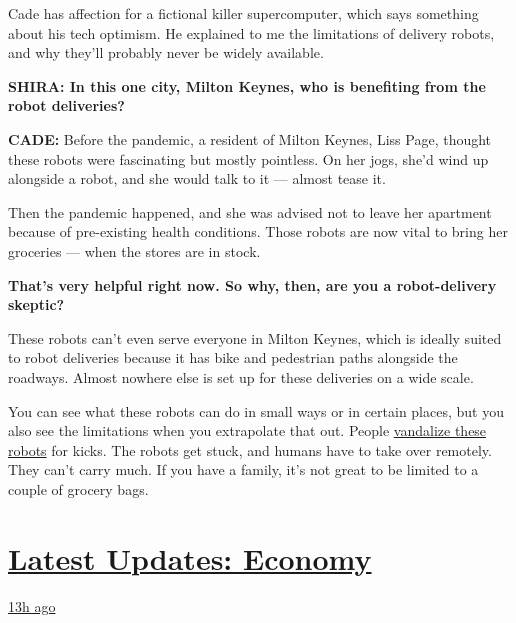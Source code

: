 Cade has affection for a fictional killer supercomputer, which says
something about his tech optimism. He explained to me the limitations of
delivery robots, and why they'll probably never be widely available.

\textbf{SHIRA: In this one city, Milton Keynes, who is benefiting from
the robot deliveries?}

\textbf{CADE:} Before the pandemic, a resident of Milton Keynes, Liss
Page, thought these robots were fascinating but mostly pointless. On her
jogs, she'd wind up alongside a robot, and she would talk to it ---
almost tease it.

Then the pandemic happened, and she was advised not to leave her
apartment because of pre-existing health conditions. Those robots are
now vital to bring her groceries --- when the stores are in stock.

\textbf{That's very helpful right now. So why, then, are you a
robot-delivery skeptic?}

These robots can't even serve everyone in Milton Keynes, which is
ideally suited to robot deliveries because it has bike and pedestrian
paths alongside the roadways. Almost nowhere else is set up for these
deliveries on a wide scale.

You can see what these robots can do in small ways or in certain places,
but you also see the limitations when you extrapolate that out. People
\href{https://www.sfchronicle.com/business/article/Kiwibots-win-fans-at-UC-Berkeley-as-they-deliver-13895867.php?psid=9L4Fj}{vandalize
these robots} for kicks. The robots get stuck, and humans have to take
over remotely. They can't carry much. If you have a family, it's not
great to be limited to a couple of grocery bags.

\hypertarget{latest-updates-economy}{%
\section{\texorpdfstring{\href{https://www.nytimes3xbfgragh.onion/live/2020/08/03/business/stock-market-today-coronavirus?action=click\&pgtype=Article\&state=default\&region=MAIN_CONTENT_1\&context=storylines_live_updates}{Latest
Updates:
Economy}}{Latest Updates: Economy}}\label{latest-updates-economy}}

\href{https://www.nytimes3xbfgragh.onion/live/2020/08/03/business/stock-market-today-coronavirus?action=click\&pgtype=Article\&state=default\&region=MAIN_CONTENT_1\&context=storylines_live_updates\#the-chicago-fed-president-says-its-up-to-congress-to-save-the-economy}{13h
ago}


